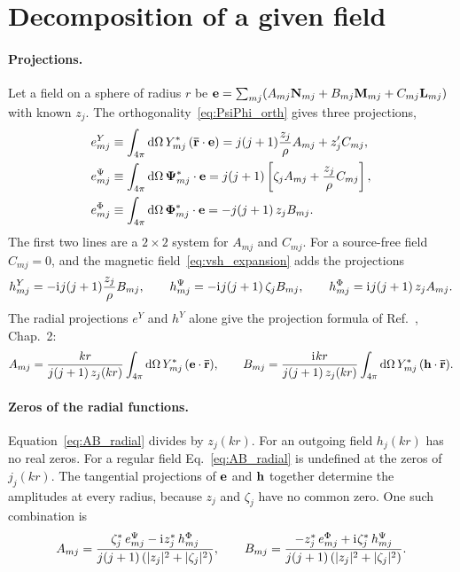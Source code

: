 \documentclass[
    pra,
    aps,
    reprint,
    onecolumn,
    amsmath,amssymb,
    a4paper,
    superscriptaddress,
    10pt,
    nofootinbib
]{revtex4-2}
\newcommand{\iu}{\mathrm{i}\mkern1mu}                 %
\newcommand{\ort}[1]{\boldsymbol{\mathbf{\bar{#1}}}}  %
\newcommand{\jj}{j(j+1)}
\begin{document}
\section{Decomposition of a given field}
\label{sec:decomposition}

\paragraph{Projections.}
Let a field on a sphere of radius $r$ be $\vb{e} = \sum_{mj}(A_{mj}\vb{N}_{mj} + B_{mj}\vb{M}_{mj} + C_{mj}\vb{L}_{mj})$ with known $z_j$.
The orthogonality~\eqref{eq:PsiPhi_orth} gives three projections,
\begin{align}
    e^{Y}_{mj} &\equiv \int_{4\pi}\dd\Omega\, Y^*_{mj}\, (\ort{r}\cdot\vb{e}) = \jj\frac{z_j}{\rho}A_{mj} + z_j' C_{mj}, \nonumber \\
    e^{\Psi}_{mj} &\equiv \int_{4\pi}\dd\Omega\, \vb{\Psi}^*_{mj}\cdot\vb{e} = \jj\left[\zeta_j A_{mj} + \frac{z_j}{\rho} C_{mj}\right],
    \label{eq:projections} \\
    e^{\Phi}_{mj} &\equiv \int_{4\pi}\dd\Omega\, \vb{\Phi}^*_{mj}\cdot\vb{e} = -\jj\, z_j B_{mj} . \nonumber
\end{align}
The first two lines are a $2\times2$ system for $A_{mj}$ and $C_{mj}$.
For a source-free field $C_{mj} = 0$, and the magnetic field~\eqref{eq:vsh_expansion} adds the projections
\begin{equation}
    h^{Y}_{mj} = -\iu\jj\frac{z_j}{\rho}B_{mj}, \qquad
    h^{\Psi}_{mj} = -\iu\jj\,\zeta_j B_{mj}, \qquad
    h^{\Phi}_{mj} = \iu\jj\, z_j A_{mj} .
    \label{eq:projections_h}
\end{equation}
The radial projections $e^Y$ and $h^Y$ alone give the projection formula of Ref.~\cite{Thesis}, Chap.~2:
\begin{equation}
    A_{mj} = \frac{kr}{\jj\, z_j(kr)}\int_{4\pi}\dd\Omega\, Y^*_{mj}\,(\vb{e}\cdot\ort{r}), \qquad
    B_{mj} = \frac{\iu kr}{\jj\, z_j(kr)}\int_{4\pi}\dd\Omega\, Y^*_{mj}\,(\vb{h}\cdot\ort{r}) .
    \label{eq:AB_radial}
\end{equation}

\paragraph{Zeros of the radial functions.}
Equation~\eqref{eq:AB_radial} divides by $z_j(kr)$.
For an outgoing field $h_j(kr)$ has no real zeros.
For a regular field Eq.~\eqref{eq:AB_radial} is undefined at the zeros of $j_j(kr)$.
The tangential projections of $\vb{e}$ and $\vb{h}$ together determine the amplitudes at every radius, because $z_j$ and $\zeta_j$ have no common zero.
One such combination is
\begin{equation}
    A_{mj} = \frac{\zeta_j^*\, e^{\Psi}_{mj} - \iu z_j^*\, h^{\Phi}_{mj}}{\jj\left(|z_j|^2 + |\zeta_j|^2\right)}, \qquad
    B_{mj} = \frac{-z_j^*\, e^{\Phi}_{mj} + \iu\zeta_j^*\, h^{\Psi}_{mj}}{\jj\left(|z_j|^2 + |\zeta_j|^2\right)} .
    \label{eq:AB_lsq}
\end{equation}
\end{document}
